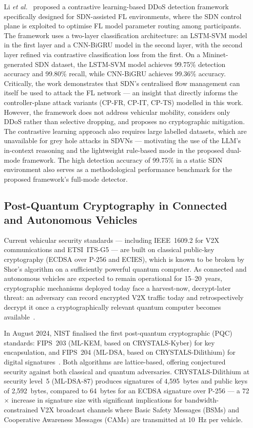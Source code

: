 \documentclass[12pt, a4paper]{report}
\begin{document}
Li \textit{et al.}~\cite{li2025ddos} proposed a contrastive learning-based
DDoS detection framework specifically designed for SDN-assisted FL environments,
where the SDN control plane is exploited to optimise FL model parameter
routing among participants. The framework uses a two-layer classification
architecture: an LSTM-SVM model in the first layer and a CNN-BiGRU model
in the second layer, with the second layer refined via contrastive
classification loss from the first. On a Mininet-generated SDN dataset,
the LSTM-SVM model achieves 99.75\% detection accuracy and 99.80\% recall,
while CNN-BiGRU achieves 99.36\% accuracy. Critically, the work demonstrates
that SDN's centralised flow management can itself be used to attack the FL
network — an insight that directly informs the controller-plane attack
variants (CP-FR, CP-IT, CP-TS) modelled in this work. However, the
framework does not address vehicular mobility, considers only DDoS rather
than selective dropping, and proposes no cryptographic mitigation. The
contrastive learning approach also requires large labelled datasets, which
are unavailable for grey hole attacks in SDVNs — motivating the use of
the LLM's in-context reasoning and the lightweight rule-based mode in
the proposed dual-mode framework. The high detection accuracy of 99.75\%
in a static SDN environment also serves as a methodological performance
benchmark for the proposed framework's full-mode detector.

\subsection{Post-Quantum Cryptography in Connected and Autonomous Vehicles}
\label{sec:lit_pqc_cav}

Current vehicular security standards — including IEEE~1609.2 for V2X
communications and ETSI~ITS-G5 — are built on classical public-key
cryptography (ECDSA over P-256 and ECIES), which is known to be broken
by Shor's algorithm on a sufficiently powerful quantum computer. As
connected and autonomous vehicles are expected to remain operational for
15--20~years, cryptographic mechanisms deployed today face a
harvest-now, decrypt-later threat: an adversary can record encrypted
V2X traffic today and retrospectively decrypt it once a
cryptographically relevant quantum computer becomes
available~\cite{nist2024fips203}.

In August 2024, NIST finalised the first post-quantum cryptographic
(PQC) standards: FIPS~203 (ML-KEM, based on CRYSTALS-Kyber) for key
encapsulation, and FIPS~204 (ML-DSA, based on CRYSTALS-Dilithium) for
digital signatures~\cite{nist2024fips203,nist2024fips204}. Both
algorithms are lattice-based, offering conjectured security against both
classical and quantum adversaries. CRYSTALS-Dilithium at security
level~5 (ML-DSA-87) produces signatures of 4,595~bytes and public
keys of 2,592~bytes, compared to 64~bytes for an ECDSA signature
over P-256 — a 72$\times$ increase in signature size with significant
implications for bandwidth-constrained V2X broadcast channels where
Basic Safety Messages (BSMs) and Cooperative Awareness Messages (CAMs)
are transmitted at 10~Hz per vehicle.
\end{document}
